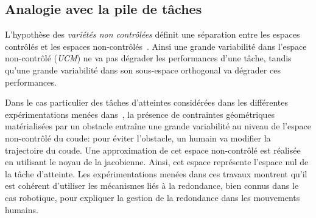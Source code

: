 \subsection{Analogie avec la pile de t\^aches}
L'hypothèse des \emph{variétés non contrôlées}
définit une séparation entre les espaces contrôlés et les espaces non-contrôlés~\cite{scholz99}.
Ainsi une grande variabilité dans l'espace non-contrôlé (\emph{UCM}) ne 
va pas dégrader les performances d'une t\^ache,
tandis qu'une grande variabilité dans son sous-espace orthogonal va
dégrader ces performances.

Dans le cas particulier des t\^aches d'atteintes considérées
dans les différentes expérimentations menées dans~\cite{jacquierbret09},
la présence de contraintes géométriques matérialisées 
par un obstacle entraîne une grande variabilité au niveau
de l'espace non-contrôlé du coude: pour éviter l'obstacle,
un humain va modifier la trajectoire du coude.
Une approximation de cet espace non-contrôlé est réalisée en utilisant le noyau 
de la jacobienne. Ainsi, cet espace 
représente l'espace nul de la t\^ache d'atteinte.
Les expérimentations menées dans ces travaux
montrent qu'il
est cohérent d'utiliser les mécanismes liés à la redondance,
bien connus dans le cas robotique, pour expliquer
la gestion de la redondance dans les mouvements humains.
